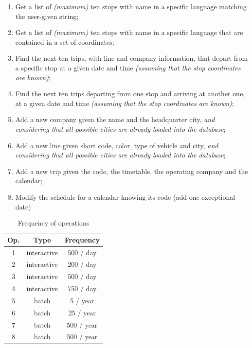 	\begin{enumerate}[itemsep=1.5pt]
		\item Get a list of \textit{(maximum)} ten stops with name in a specific language matching the user-given string;
		\item Get a list of \textit{(maximum)} ten stops with name in a specific language that are contained in a set of coordinates;
		\item Find the next ten trips, with line and company information, that depart from a specific stop at a given date and time \textit{(assuming that the stop coordinates are known)};
		\item Find the next ten trips departing from one stop and arriving at another one, at a given date and time \textit{(assuming that the stop coordinates are known)};
		\item Add a new company given the name and the headquarter city, \textit{and considering that all possible cities are already loaded into the database};
		\item Add a new line given short code, color, type of vehicle and city, \textit{and considering that all possible cities are already loaded into the database};
		\item Add a new trip given the code, the timetable, the operating company and the calendar;
		\item Modify the schedule for a calendar knowing its code (add one exceptional date)
	\end{enumerate}

	\begin{table}[h!]
		\centering
		\begin{tabular}{|c|c|c|}
			\hline
			\textbf{Op.} & \textbf{Type} & \textbf{Frequency} \\
			\hline
			1 & interactive & 500 / day \\ \hline
			2 & interactive & 200 / day \\ \hline
			3 & interactive & 500 / day \\ \hline
			4 & interactive & 750 / day \\ \hline
			5 & batch & 5 / year \\ \hline
			6 & batch & 25 / year \\ \hline
			7 & batch & 500 / year \\ \hline
			8 & batch & 500 / year \\ \hline
		\end{tabular}
		\caption{Frequency of operations}\label{tbl:operations}
	\end{table}
